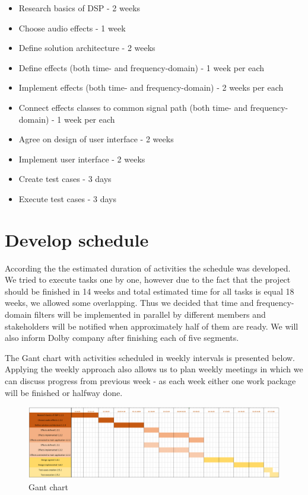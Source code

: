 \documentclass[12pt]{article}
\begin{document}
	\begin{itemize}
	\item Research basics of DSP - 2 weeks
	\item Choose audio effects - 1 week
	\item Define solution architecture - 2 weeks
	\item Define effects (both time- and frequency-domain) - 1 week per each
	\item Implement effects (both time- and frequency-domain) - 2 weeks per each
	\item Connect effects classes to common signal path (both time- and frequency-domain) - 1 week per each
	\item Agree on design of user interface - 2 weeks
	\item Implement user interface - 2 weeks
	\item Create test cases - 3 days
	\item Execute test cases - 3 days
	\end{itemize}

\section{Develop schedule}

	According the the estimated duration of activities the schedule was developed. We tried to execute tasks one by one, however due to the fact that the project should be finished in 14 weeks and total estimated time for all tasks is equal 18 weeks, we allowed some overlapping. Thus we decided that time and frequency-domain filters will be implemented in parallel by different members and stakeholders will be notified when approximately half of them are ready. We will also inform Dolby company after finishing each of five segments.
	
	The Gant chart with activities scheduled in weekly intervals is presented below. Applying the weekly approach also allows us to plan weekly meetings in which we can discuss progress from previous week - as each week either one work package will be finished or halfway done.

\begin{figure}[H]
		\includegraphics[width=1.1\textwidth, center]{Gant chart}
		\caption{Gant chart}
	\end{figure}
\end{document}
